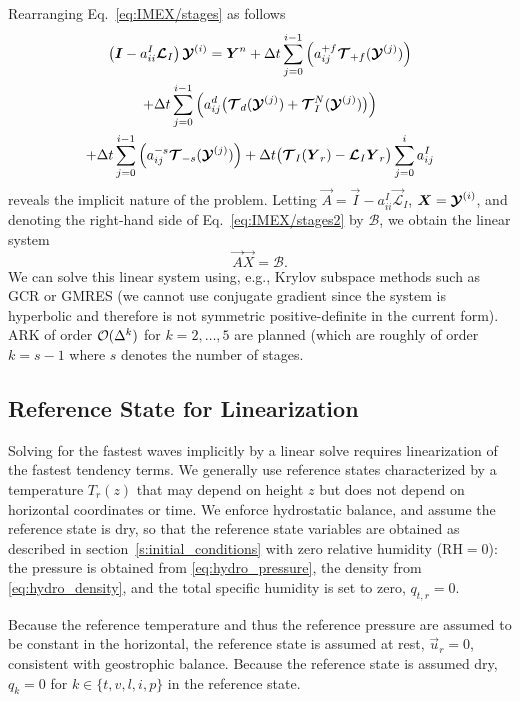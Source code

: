 \documentclass{report}
\begin{document}
{{Rearranging Eq.~\eqref{eq:IMEX/stages} as follows 
\begin{multline}\label{eq:IMEX/stages2}
\left( \boldsymbol{{I}} - {a}^{I}_{ii}\boldsymbol{{\mathcal{L}}}_{I} \right)  \boldsymbol{{\mathcal{Y}}}^{(i)}  =  \boldsymbol{{Y}}^n + 
\Delta t \sum_{j=0}^{i-1} \left( {a}^{+f}_{ij} \boldsymbol{{\mathcal{T}}}_{+f}(\boldsymbol{{\mathcal{Y}}}^{(j)}) \right)   \\
+ \Delta t \sum_{j=0}^{i-1} \left( {a}^{d}_{ij} \bigl(\boldsymbol{{\mathcal{T}}}_{d}(\boldsymbol{{\mathcal{Y}}}^{(j)}) + \boldsymbol{{\mathcal{T}}}^N_I(\boldsymbol{{\mathcal{Y}}}^{(j)})\bigr) \right) \\
+ \Delta t \sum_{j=0}^{i-1} \left( {a}^{-s}_{ij} \boldsymbol{{\mathcal{T}}}_{-s}(\boldsymbol{{\mathcal{Y}}}^{(j)}) \right) + \Delta t \bigl(\boldsymbol{{\mathcal{T}}}_I(\boldsymbol{{Y}}_r) - \boldsymbol{{\mathcal{L}}}_I \boldsymbol{{Y}}_r \bigr) \sum_{j=0}^i a_{ij}^I
\end{multline}
reveals the implicit nature of the problem. Letting $\vec{A}=\vec{I} - {a}^{I}_{ii} \vec{\mathcal{L}}_{I}$, $\boldsymbol{{X}}=\boldsymbol{{\mathcal{Y}}}^{(i)}$, and denoting the right-hand side of Eq.~\eqref{eq:IMEX/stages2} by $\mathcal{B}$, we obtain the linear system 
\[
\vec{A} \vec{X} = \mathcal{B}.
\]
We can solve this linear system using, e.g., Krylov subspace methods such as GCR or GMRES (we cannot use conjugate gradient since the system is hyperbolic and therefore is not symmetric positive-definite in the current form). ARK of order $\mathcal{O}(\Delta ^k)$ for $k=2,\ldots,5$ are planned (which are roughly of order $k=s-1$ where $s$ denotes the number of stages.
}

\subsection{Reference State for Linearization}

Solving for the fastest waves implicitly by a linear solve requires linearization of the fastest tendency terms. We generally use reference states characterized by a temperature $T_r(z)$ that may depend on height $z$ but does not depend on horizontal coordinates or time. We enforce hydrostatic balance, and assume the reference state is dry, so that the reference state variables are obtained as described in section~\ref{s:initial_conditions} with zero relative humidity ($\mathrm{RH}=0$): the pressure is obtained from \eqref{eq:hydro_pressure}, the density from \eqref{eq:hydro_density}, and the total specific humidity is set to zero, $q_{t,r}=0$.

Because the reference temperature and thus the reference pressure are assumed to be constant in the horizontal, the reference state is assumed at rest, $\vec{u}_r = 0$, consistent with geostrophic balance. Because the reference state is assumed dry, $q_k= 0$ for $k \in \{ t, v, l, i, p\}$ in the reference state.

}
\end{document}
